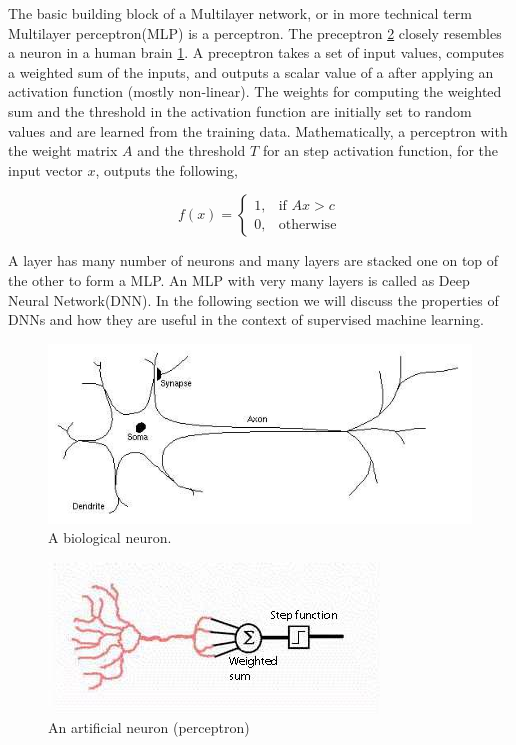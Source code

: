 \documentclass[conference]{IEEEtran}
\begin{document}
The basic building block of a Multilayer network, or in more technical term Multilayer  perceptron(MLP) is a perceptron. The preceptron \ref{fig:ann} closely resembles a neuron in a human brain \ref{fig:neuron}. A preceptron takes a set of input values, computes a weighted sum of the inputs, and outputs a scalar value of a after applying an activation function (mostly non-linear). The weights for computing the weighted sum and the threshold in the activation function are initially set to random values and are learned from the training data. 
Mathematically, a perceptron with the weight matrix $A$ and the threshold $T$ for an step activation function, for the input vector $x$, outputs the following,


\[
    f(x)= 
\begin{cases}
    1,& \text{if }  A x > c \\
    0,              & \text{otherwise}
\end{cases}
\]

A layer has many number of neurons and many layers are stacked one on top of the other to form a MLP. An MLP with very many layers is called as Deep Neural Network(DNN). In the following section we will discuss the properties of DNNs and how they are useful in the context of supervised machine learning.


\begin{figure}
    \includegraphics[width=.99\linewidth]{img/bioneuron.jpg}  
    \caption{A biological neuron.}
    \label{fig:neuron}
\end{figure}

\begin{figure}
    \includegraphics[width=.99\linewidth]{img/artificial.jpg}  
    \caption{ An artificial neuron (perceptron)}
    \label{fig:ann}
\end{figure}
\end{document}
